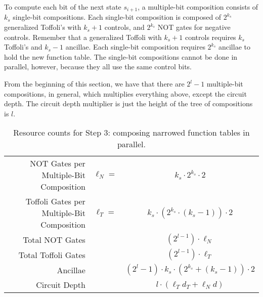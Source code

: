 To compute each bit of the next state
$s_{i+1}$, a multiple-bit composition consists of 
$k_s$ single-bit compositions. Each single-bit composition is
composed of $2^{k_s}$ generalized Toffoli's with $k_s +1$ controls, and
$2^{k_s}$ NOT gates for negative controls. Remember that a generalized
Toffoli with $k_s + 1$ controls requires $k_s$ Toffoli's and $k_s - 1$
ancillae. Each single-bit composition requires $2^{k_s}$ ancillae to
hold the new function table. The single-bit compositions cannot be done
in parallel, however, because they all use the same control bits.

From the beginning of this section, we have that there are $2^l - 1$
multiple-bit compositions, in general, which multiplies everything above,
except the circuit depth. The circuit depth multiplier is
just the height of the tree of compositions is $l$.

\begin{table}[!h]
\begin{center}
\begin{tabular}{|r|cc|}
\hline
NOT Gates per Multiple-Bit Composition & $\ell_N = $ & $k_s \cdot 2^{k_s} \cdot 2$ \\
Toffoli Gates per Multiple-Bit Composition & $\ell_T = $ & $k_s \cdot (2^{k_s}\cdot (k_s-1)) \cdot 2$\\
Total NOT Gates & & $(2^{l-1}) \cdot \ell_N$ \\
Total Toffoli Gates & & $(2^{l-1}) \cdot \ell_T$ \\
Ancillae & & $(2^l - 1)\cdot k_s \cdot (2^{k_s} + (k_s - 1)) \cdot 2$\\
Circuit Depth & & $l\cdot(\ell_T d_T + \ell_N d)$\\
\hline
\end{tabular}
\caption{Resource counts for Step 3: composing narrowed function tables in parallel.}
\end{center}
\end{table}